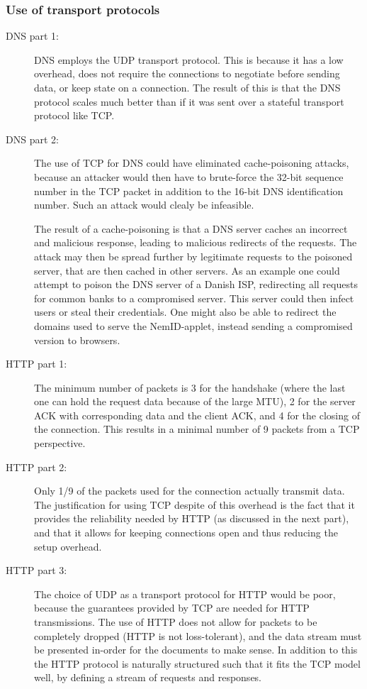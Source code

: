 \subsubsection{Use of transport protocols}
\begin{description}
    \item[DNS part 1:] DNS employs the UDP transport protocol. This is because it has a low overhead, does not require
        the connections to negotiate before sending data, or keep state on a connection. The result of this is that the DNS
        protocol scales much better than if it was sent over a stateful transport protocol like TCP. %
    \item[DNS part 2:] The use of TCP for DNS could have eliminated cache-poisoning attacks, because an attacker would then have
        to brute-force the 32-bit sequence number in the TCP packet in addition to the 16-bit DNS identification number.
        Such an attack would clealy be infeasible.

        The result of a cache-poisoning is that a DNS server caches an incorrect and malicious response, leading to malicious redirects
        of the requests. The attack may then be spread further by legitimate requests to the poisoned server, that are then cached in
        other servers. As an example one could attempt to poison the DNS server of a Danish ISP, redirecting all requests for common banks
        to a compromised server. This server could then infect users or steal their credentials. One might also be able to redirect
        the domains used to serve the NemID-applet, instead sending a compromised version to browsers.
    \item[HTTP part 1:] The minimum number of packets is 3 for the handshake (where the last one can hold the request data because
        of the large MTU), 2 for the server ACK with corresponding data and the client ACK, and 4 for the closing of the connection.
        This results in a minimal number of 9 packets from a TCP perspective.
    \item[HTTP part 2:] Only 1/9 of the packets used for the connection actually transmit data. The justification for using
        TCP despite of this overhead is the fact that it provides the reliability needed by HTTP (as discussed in the next part), and
        that it allows for keeping connections open and thus reducing the setup overhead.
    \item[HTTP part 3:] The choice of UDP as a transport protocol for HTTP would be poor, because the guarantees provided by
        TCP are needed for HTTP transmissions. The use of HTTP does not allow for packets to be completely dropped (HTTP is not
        loss-tolerant), and the data stream must be presented in-order for the documents to make sense. In addition to this the
        HTTP protocol is naturally structured such that it fits the TCP model well, by defining a stream of requests and responses.
\end{description}

